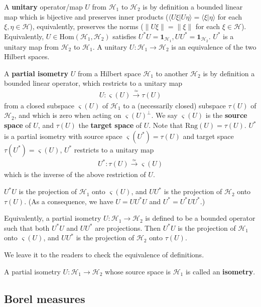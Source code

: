 \documentclass[12pt,a4paper,notitlepage]{article}
\theoremstyle{definition}
\theoremstyle{plain}
\newcommand{\mc}{\mathcal}
\newcommand{\id}{\mathbf{1}}
\newcommand{\Hom}{\mathrm{Hom}}
\newcommand{\bk}[1]{\langle {#1}\rangle}
\newcommand{\sgm}{\varsigma}
\newcommand{\Rng}{\mathrm{Rng}}
\numberwithin{equation}{section}
\begin{document}
A \textbf{unitary} operator/map $U$ from $\mc H_1$ to $\mc H_2$ is by definition a bounded linear map which is bijective and preserves inner products ($\bk {U\xi|U\eta}=\bk{\xi|\eta}$ for each $\xi,\eta\in\mc H$), equivalently, preserves the norms ($\lVert U\xi\lVert=\lVert \xi\lVert$ for each $\xi\in\mc H$). Equivalently, $U\in\Hom(\mc H_1,\mc H_2)$ satisfies $U^*U=\id_{\mc H_1},UU^*=\id_{\mc H_2}$. $U^*$ is a unitary map from $\mc H_2$ to $\mc H_1$. A unitary $U:\mc H_1\rightarrow\mc H_2$ is an equivalence of the two Hilbert spaces. 


A \textbf{partial isometry} $U$ from a Hilbert space $\mc H_1$ to another $\mc H_2$ is by definition a bounded linear operator, which restricts to a unitary map
\begin{align*}
U:\sgm(U)\xrightarrow{\simeq}\tau(U)	
\end{align*}
from a closed subspace $\sgm(U)$ of $\mc H_1$ to a (necessarily closed) subspace $\tau(U)$ of $\mc H_2$, and which is zero when acting on $\sgm(U)^\perp$. We say $\varsigma(U)$ is the \textbf{source space} of $U$, and $\tau(U)$ the \textbf{target space} of $U$.  Note that $\Rng(U)=\tau(U)$. $U^*$ is a partial isometry with source space $\varsigma(U^*)=\tau(U)$ and target space $\tau(U^*)=\varsigma(U)$, $U^*$ restricts to a unitary map
\begin{align*}
U^*:\tau(U)\xrightarrow{\simeq}\sgm(U)	
\end{align*}
which is the inverse of the above restriction of $U$.

$U^*U$ is the projection of $\mc H_1$ onto $\varsigma(U)$, and $UU^*$ is the projection of $\mc H_2$ onto $\tau(U)$. (As a consequence, we have $U=UU^*U$ and $U^*=U^*UU^*$.)

Equivalently, a partial isometry $U:\mc H_1\rightarrow\mc H_2$ is defined to be a bounded operator such that both $U^*U$ and $UU^*$ are projections. Then $U^*U$ is the projection of $\mc H_1$ onto $\varsigma(U)$, and $UU^*$ is the projection of $\mc H_2$ onto $\tau(U)$. 

We leave it to the readers to check the equivalence of definitions.

A partial isometry $U:\mc H_1\rightarrow\mc H_2$ whose source space is $\mc H_1$ is called an \textbf{isometry}.

\subsection*{Borel measures}
\end{document}
